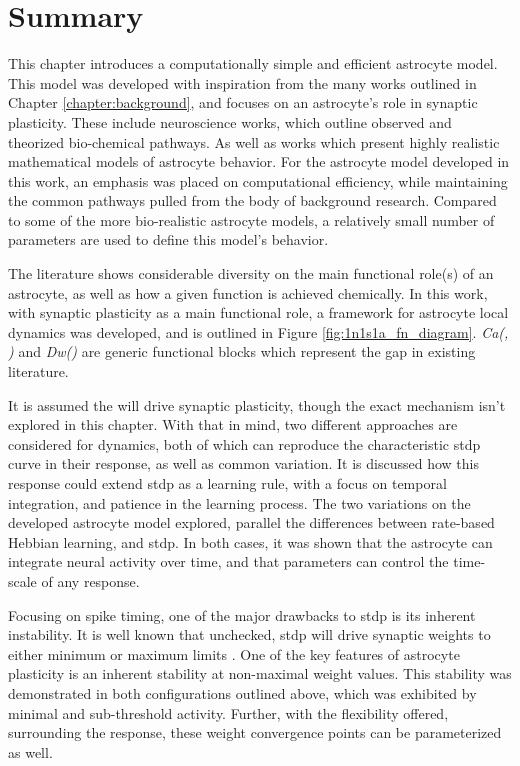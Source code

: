 
\section{Summary}

This chapter introduces a computationally simple and efficient astrocyte
model. This model was developed with inspiration from the many works outlined in
Chapter \ref{chapter:background}, and focuses on an astrocyte's role in synaptic
plasticity. These include neuroscience works, which outline observed and
theorized bio-chemical pathways. As well as works which present highly realistic
mathematical models of astrocyte behavior. For the astrocyte model developed in
this work, an emphasis was placed on computational efficiency, while maintaining
the common pathways pulled from the body of background research. Compared to
some of the more bio-realistic astrocyte models, a relatively small number of
parameters are used to define this model's behavior.

The literature shows considerable diversity on the main functional role(s) of an
astrocyte, as well as how a given function is achieved chemically. In this work,
with synaptic plasticity as a main functional role, a framework for astrocyte
local dynamics was developed, and is outlined in Figure
\ref{fig:1n1s1a_fn_diagram}. \emph{Ca(\ipt, \kp\!)} and \emph{Dw(\ca\!)} are generic
functional blocks which represent the gap in existing literature.

It is assumed the \ca will drive synaptic plasticity, though the exact mechanism
isn't explored in this chapter. With that in mind, two different approaches are
considered for \ca dynamics, both of which can reproduce the characteristic
\gls{stdp} curve in their \ca response, as well as common variation. It is discussed
how this \ca response could extend \gls{stdp} as a learning rule, with a focus
on temporal integration, and patience in the learning process. The two
variations on the developed astrocyte model explored, parallel the differences
between rate-based Hebbian learning, and \gls{stdp}. In both cases, it was shown
that the astrocyte can integrate neural activity over time, and that parameters
can control the time-scale of any response.

Focusing on spike timing, one of the major drawbacks to \gls{stdp} is its
inherent instability. It is well known that unchecked, \gls{stdp} will drive
synaptic weights to either minimum or maximum limits
\parencite{legenstein_2005}. One of the key features of astrocyte plasticity is
an inherent stability at non-maximal weight values. This stability was
demonstrated in both configurations outlined above, which was exhibited by
minimal and sub-threshold \ca activity. Further, with the flexibility offered,
surrounding the \ca response, these weight convergence points can be
parameterized as well.

